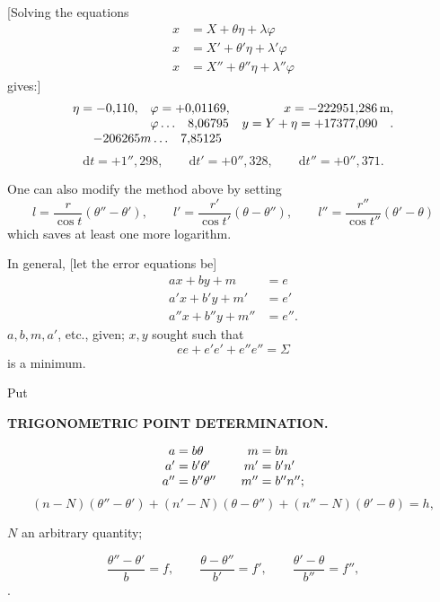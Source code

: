 [Solving the equations
\[
\begin{aligned}
 x&=X+\theta\eta+\lambda\varphi\\
 x&=X'+\theta'\eta+\lambda'\varphi\\
 x&=X''+\theta''\eta+\lambda''\varphi
\end{aligned}
\]
\noindent gives:]
\[
\begin{array}{@{}r@{\quad}l@{\quad}r@{}}
 \eta=-0{,}110,&\varphi=+0{,}01169,&x=-222951{,}286\,\mathrm{m},\\
 &\varphi\,.\,.\,.\quad 8{,}06795&y=Y+\eta=+17377{,}090\quad .\\
 \multicolumn{2}{c}{-206265m\,.\,.\,.\quad 7{,}85125}&
\end{array}
\]
\[
 \mathrm{d}t=+1''{,}298,\qquad
 \mathrm{d}t'=+0''{,}328,\qquad
 \mathrm{d}t''=+0''{,}371.
\]

One can also modify the method above by setting
\[
 l=\frac{r}{\cos t}(\theta''-\theta'),\qquad
 l'=\frac{r'}{\cos t'}(\theta-\theta''),\qquad
 l''=\frac{r''}{\cos t''}(\theta'-\theta)
\]
\noindent which saves at least one more logarithm.

\bigskip
{\centering
[4.]\par{}\par}
In general, [let the error equations be]
\[
\begin{aligned}
 ax+by+m&=e\\
 a'x+b'y+m'&=e'\\
 a''x+b''y+m''&=e''.
\end{aligned}
\]
\noindent \(a,b,m,a'\), etc., given; \(x,y\) sought such that
\[
 ee+e'e'+e''e''=\Sigma
\]
\noindent is a minimum.

Put

\par\clearpage
\noindent\null\hfill{\small\textbf{TRIGONOMETRIC POINT DETERMINATION.}}\hfill{}\par\medskip

\[
\begin{array}{@{}r@{\;=\;}l@{\qquad}r@{\;=\;}l@{}}
 a&b\theta&m&bn\\
 a'&b'\theta'&m'&b'n'\\
 a''&b''\theta''&m''&b''n'';
\end{array}
\]
\[
 (n-N)(\theta''-\theta')+(n'-N)(\theta-\theta'')+
 (n''-N)(\theta'-\theta)=h,
\]
{\centering \(N\) an arbitrary quantity;\par}
\[
 \frac{\theta''-\theta'}{b}=f,\qquad
 \frac{\theta-\theta''}{b'}=f',\qquad
 \frac{\theta'-\theta}{b''}=f'',
\]
.
\]

